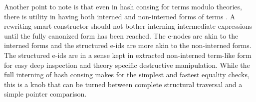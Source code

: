 \documentclass[sigconf]{acmart}
\begin{document}
Another point to note is that even in hash consing for terms modulo theories, there is utility in having both interned and non-interned forms of terms \cite{kontroliefficient}. A rewriting smart constructor should not bother interning intermediate expressions until the fully canonized form has been reached. The e-nodes are akin to the interned forms and the structured e-ids are more akin to the non-interned forms. The structured e-ids are in a sense kept in extracted non-interned term-like form for easy deep inspection and theory specific destructive manipulation. While the full interning of hash consing makes for the simplest and fastest equality checks, this is a knob that can be turned between complete structural traversal and a simple pointer comparison. %







  

\end{document}

